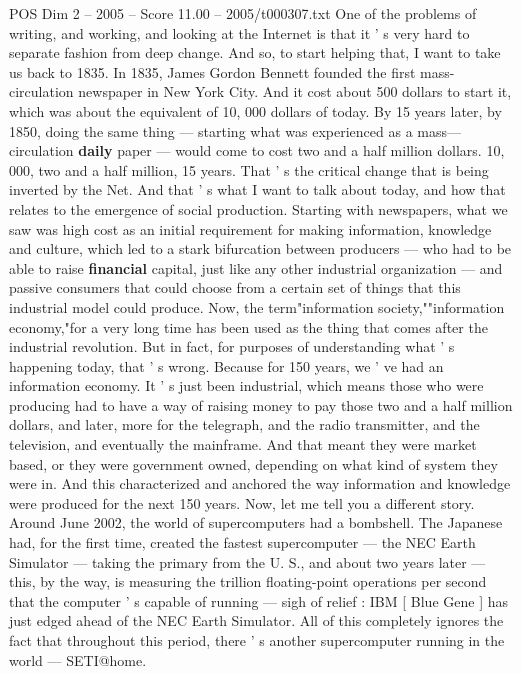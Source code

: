 \begin{textsample}{POS Dim 2 – 2005 – Score 11.00 – 2005/t000307.txt}  \label{ex:f2_pos_023}
One of the problems of writing, and working, and looking at the Internet is that it ' s very hard to separate fashion from deep change.
And so, to start helping that, I want to take us back to 1835.
In 1835, James Gordon Bennett founded the first mass-circulation newspaper in New York City.
And it cost about 500 dollars to start it, which was about the equivalent of 10, 000 dollars of today.
By 15 years later, by 1850, doing the same thing — starting what was experienced as a mass—circulation \textbf{daily} paper — would come to cost two and a half million dollars. 10, 000, two and a half million, 15 years.
That ' s the critical change that is being inverted by the Net.
And that ' s what I want to talk about today, and how that relates to the emergence of social production.
Starting with newspapers, what we saw was high cost as an initial requirement for making information, knowledge and culture, which led to a stark bifurcation between producers — who had to be able to raise \textbf{financial} capital, just like any other industrial organization — and passive consumers that could choose from a certain set of things that this industrial model could produce.
Now, the term"information society,""information economy,"for a very long time has been used as the thing that comes after the industrial revolution.
But in fact, for purposes of understanding what ' s happening today, that ' s wrong.
Because for 150 years, we ' ve had an information economy.
It ' s just been industrial, which means those who were producing had to have a way of raising money to pay those two and a half million dollars, and later, more for the telegraph, and the radio transmitter, and the television, and eventually the mainframe.
And that meant they were market based, or they were government owned, depending on what kind of system they were in.
And this characterized and anchored the way information and knowledge were produced for the next 150 years.
Now, let me tell you a different story.
Around June 2002, the world of supercomputers had a bombshell.
The Japanese had, for the first time, created the fastest supercomputer — the NEC Earth Simulator — taking the primary from the U.
S., and about two years later — this, by the way, is measuring the trillion floating-point operations per second that the computer ' s capable of running — sigh of relief : IBM [ Blue Gene ] has just edged ahead of the NEC Earth Simulator.
All of this completely ignores the fact that throughout this period, there ' s another supercomputer running in the world — SETI@home.

\end{textsample}
